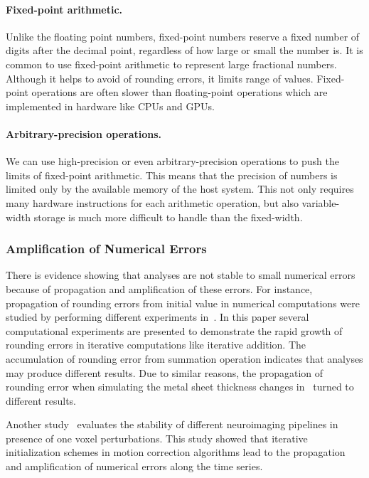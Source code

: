 \paragraph{Fixed-point arithmetic.} Unlike the floating point numbers, 
fixed-point numbers reserve a fixed number of digits after the decimal 
point, regardless of how large or small the number is.
It is common to use fixed-point arithmetic to represent large 
fractional numbers. Although it helps to avoid of rounding errors, it 
limits range of values. Fixed-point operations are often slower than 
floating-point operations which are implemented in hardware like CPUs 
and GPUs.

\paragraph{Arbitrary-precision operations.} We can use high-precision 
or even arbitrary-precision operations to push the limits of 
fixed-point arithmetic. This means that the precision of numbers is 
limited only by the available memory of the host system. 
This not only requires many hardware instructions for each arithmetic 
operation, but also variable-width storage is much more difficult to 
handle than the fixed-width. 


\subsubsection{Amplification of Numerical Errors}

There is evidence showing that analyses are not stable to small numerical 
errors because of propagation and amplification of these errors. 
For instance, propagation of rounding errors from initial value in 
numerical computations were studied by performing different experiments 
in~\cite{fadnavis1998some}. In this paper several computational 
experiments are presented to demonstrate the rapid growth of rounding 
errors in iterative computations like iterative addition. The 
accumulation of rounding error from summation operation indicates that 
analyses may produce different results. Due to similar reasons, the 
propagation of rounding error when simulating the metal sheet thickness 
changes in~\cite{diethelm2012limits} turned to different results.

Another study~\cite{Glatard2018hbm} evaluates the stability of different 
neuroimaging pipelines in presence of one voxel perturbations. This 
study showed that iterative initialization schemes in motion correction 
algorithms lead to the propagation and amplification of numerical 
errors along the time series. 


